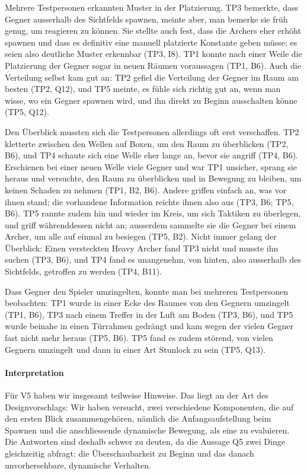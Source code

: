 \documentclass[../Main.tex]{subfiles}
\begin{document}
Mehrere Testpersonen erkannten Muster in der Platzierung. TP3 bemerkte, dass Gegner ausserhalb des Sichtfelds spawnen, meinte aber, man bemerke sie früh genug, um reagieren zu können. Sie stellte auch fest, dass die Archers eher erhöht spawnen und dass es definitiv eine manuell platzierte Konstante geben müsse; es seien also deutliche Muster erkennbar (TP3, I8). TP1 konnte nach einer Weile die Platzierung der Gegner sogar in neuen Räumen voraussagen (TP1, B6). Auch die Verteilung selbst kam gut an: TP2 gefiel die Verteilung der Gegner im Raum am besten (TP2, Q12), und TP5 meinte, es fühle sich richtig gut an, wenn man wisse, wo ein Gegner spawnen wird, und ihn direkt zu Beginn ausschalten könne (TP5, Q12).

Den Überblick mussten sich die Testpersonen allerdings oft erst verschaffen. TP2 kletterte zwischen den Wellen auf Boxen, um den Raum zu überblicken (TP2, B6), und TP4 schaute sich eine Welle eher lange an, bevor sie angriff (TP4, B6). Erschienen bei einer neuen Welle viele Gegner und war TP1 unsicher, sprang sie heraus und versuchte, den Raum zu überblicken und in Bewegung zu bleiben, um keinen Schaden zu nehmen (TP1, B2, B6). Andere griffen einfach an, was vor ihnen stand; die vorhandene Information reichte ihnen also aus (TP3, B6; TP5, B6). TP5 rannte zudem hin und wieder im Kreis, um sich Taktiken zu überlegen, und griff währenddessen nicht an; ausserdem sammelte sie die Gegner bei einem Archer, um alle auf einmal zu besiegen (TP5, B2). Nicht immer gelang der Überblick: Einen versteckten Heavy Archer fand TP3 nicht und musste ihn suchen (TP3, B6), und TP4 fand es unangenehm, von hinten, also ausserhalb des Sichtfelds, getroffen zu werden (TP4, B11).

Dass Gegner den Spieler umzingelten, konnte man bei mehreren Testpersonen beobachten: TP1 wurde in einer Ecke des Raumes von den Gegnern umzingelt (TP1, B6), TP3 nach einem Treffer in der Luft am Boden (TP3, B6), und TP5 wurde beinahe in einen Türrahmen gedrängt und kam wegen der vielen Gegner fast nicht mehr heraus (TP5, B6). TP5 fand es zudem störend, von vielen Gegnern umzingelt und dann in einer Art Stunlock zu sein (TP5, Q13).

\paragraph{Interpretation}
Für V5 haben wir insgesamt teilweise Hinweise. Das liegt an der Art des Designvorschlags: Wir haben versucht, zwei verschiedene Komponenten, die auf den ersten Blick zusammengehören, nämlich die Anfangsaufstellung beim Spawnen und die anschliessende dynamische Bewegung, als eine zu evaluieren. Die Antworten sind deshalb schwer zu deuten, da die Aussage Q5 zwei Dinge gleichzeitig abfragt: die Überschaubarkeit zu Beginn und das danach unvorhersehbare, dynamische Verhalten.
\end{document}
